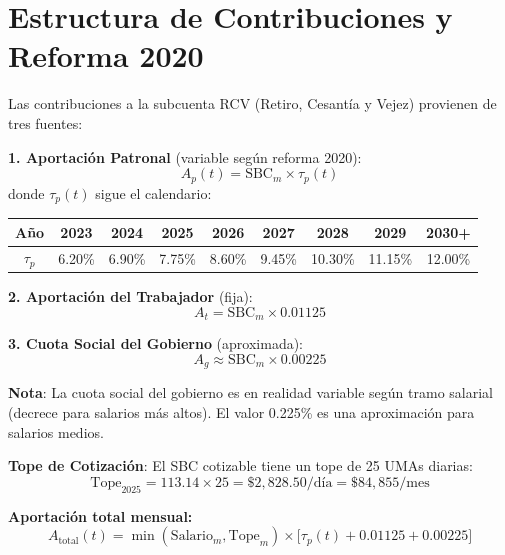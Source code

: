 \documentclass[11pt,a4paper]{report}
\begin{document}
\section{Estructura de Contribuciones y Reforma 2020}

\begin{tcolorbox}[colback=blue!5!white, colframe=blue!75!black, title=\textbf{Definici\'on Formal}]
Las contribuciones a la subcuenta RCV (Retiro, Cesant\'ia y Vejez) provienen de tres fuentes:

\textbf{1. Aportaci\'on Patronal} (variable seg\'un reforma 2020):
\[
A_p(t) = \text{SBC}_m \times \tau_p(t)
\]
donde $\tau_p(t)$ sigue el calendario:
\begin{center}
\begin{tabular}{ccccccccc}
\toprule
A\~no & 2023 & 2024 & 2025 & 2026 & 2027 & 2028 & 2029 & 2030+ \\
\midrule
$\tau_p$ & 6.20\% & 6.90\% & 7.75\% & 8.60\% & 9.45\% & 10.30\% & 11.15\% & 12.00\% \\
\bottomrule
\end{tabular}
\end{center}

\textbf{2. Aportaci\'on del Trabajador} (fija):
\[
A_t = \text{SBC}_m \times 0.01125
\]

\textbf{3. Cuota Social del Gobierno} (aproximada):
\[
A_g \approx \text{SBC}_m \times 0.00225
\]

\textbf{Nota}: La cuota social del gobierno es en realidad variable seg\'un tramo salarial (decrece para salarios m\'as altos). El valor 0.225\% es una aproximaci\'on para salarios medios.

\textbf{Tope de Cotizaci\'on}: El SBC cotizable tiene un tope de 25 UMAs diarias:
\[
\text{Tope}_{2025} = 113.14 \times 25 = \$2,828.50/\text{d\'ia} = \$84,855/\text{mes}
\]

\textbf{Aportaci\'on total mensual:}
\[
A_{\text{total}}(t) = \min(\text{Salario}_m, \text{Tope}_m) \times \big[\tau_p(t) + 0.01125 + 0.00225\big]
\]
\end{tcolorbox}
\end{document}
